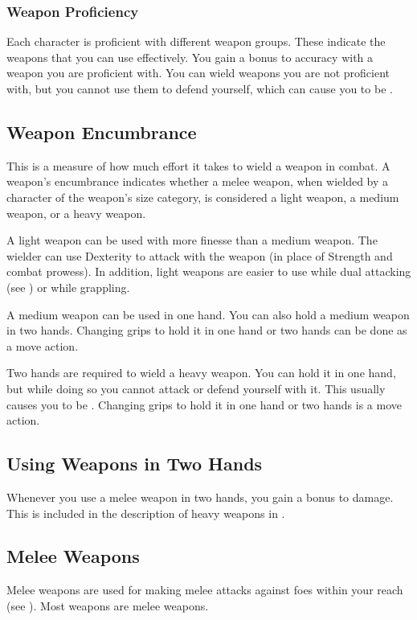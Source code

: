 \subsubsection{Weapon Proficiency}\label{Weapon Proficiency}
Each character is proficient with different weapon groups. These indicate the weapons that you can use effectively. You gain a  bonus to accuracy with a weapon you are proficient with. You can wield weapons you are not proficient with, but you cannot use them to defend yourself, which can cause you to be .

\subsection{Weapon Encumbrance}
This is a measure of how much effort it takes to wield a weapon in combat. A weapon's encumbrance indicates whether a melee weapon, when wielded by a character of the weapon's size category, is considered a light weapon, a medium weapon, or a heavy weapon.

 A light weapon can be used with more finesse than a medium weapon. The wielder can use Dexterity to attack with the weapon (in place of Strength and combat prowess). In addition, light weapons are easier to use while dual attacking (see ) or while grappling.

 A medium weapon can be used in one hand. You can also hold a medium weapon in two hands. Changing grips to hold it in one hand or two hands can be done as a move action.

 Two hands are required to wield a heavy weapon. You can hold it in one hand, but while doing so you cannot attack or defend yourself with it. This usually causes you to be . Changing grips to hold it in one hand or two hands is a move action.

\subsection{Using Weapons in Two Hands}
Whenever you use a melee weapon in two hands, you gain a  bonus to damage.
This is included in the description of heavy weapons in .

\subsection{Melee Weapons}
Melee weapons are used for making melee attacks against foes within your reach (see ). Most weapons are melee weapons.

